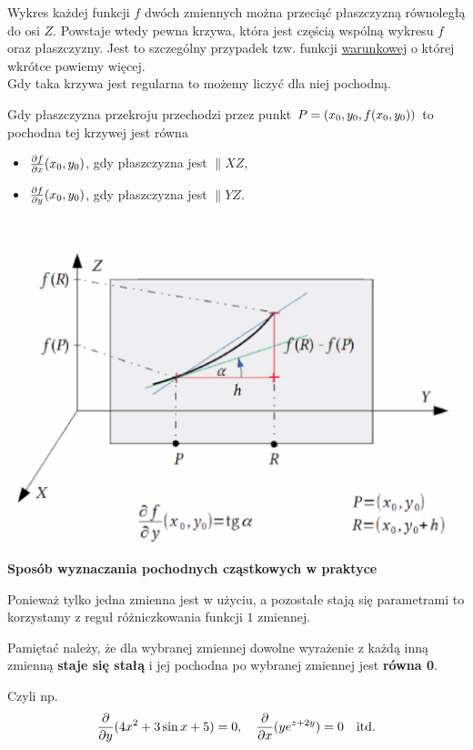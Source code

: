 Wykres każdej funkcji $f$ dwóch zmiennych można przeciąć płaszczyzną równoległą do osi $Z$. Powstaje wtedy pewna krzywa, która jest częścią wspólną wykresu $f$
oraz płaszczyzny. Jest to szczególny przypadek tzw. funkcji \underline{warunkowej} o której wkrótce powiemy więcej. \\

Gdy taka krzywa jest regularna to możemy liczyć dla niej pochodną.

Gdy płaszczyzna przekroju przechodzi przez punkt $ P=(x_0, y_0, f(x_0, y_0)) $ to pochodna tej krzywej jest równa

\begin{itemize}
    \item $ \frac{\partial f}{\partial x} (x_0, y_0) $, gdy płaszczyzna jest $\parallel XZ $,
    \item $ \frac{\partial f}{\partial y} (x_0, y_0) $, gdy płaszczyzna jest $\parallel YZ $. 
\end{itemize}

\begin{center}
\includegraphics[scale=0.4]{img/interpretacja_geom.png}
\end{center}

\textbf{Sposób wyznaczania pochodnych cząstkowych w praktyce}

Ponieważ tylko jedna zmienna jest w użyciu, a pozostałe stają się parametrami to korzystamy z reguł różniczkowania
funkcji $1$ zmiennej.

Pamiętać należy, że dla wybranej zmiennej dowolne wyrażenie z każdą inną zmienną \textbf{staje się stałą} i jej pochodna
po wybranej zmiennej jest \textbf{równa 0}.

Czyli np.
$$ \frac{\partial }{\partial y} (4x^2 + 3 \sin x + 5) = 0, \quad \frac{\partial }{\partial x} (ye^{z + 2y}) = 0 \quad \textrm{itd.} $$ \\

